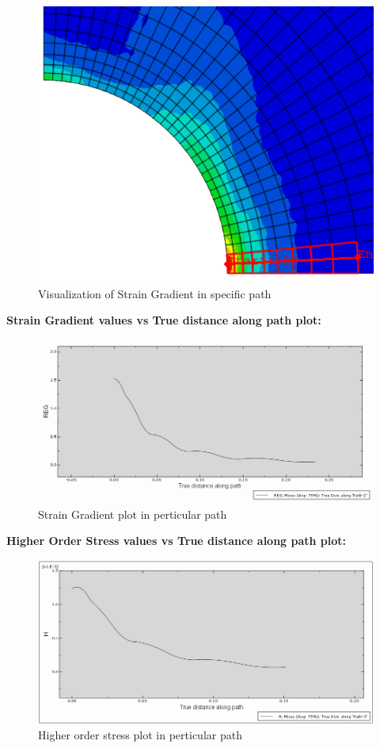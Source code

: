 \documentclass[12pt]{article}
\begin{document}
\begin{figure}[H]
	\begin{center}
		\includegraphics[scale=1]{path_full_grad_crop.png} 
	\end{center}  
	\caption{Visualization of Strain Gradient in specific path}
\end{figure}
\textbf{Strain Gradient values vs True distance along path plot:}
\begin{figure}[H]
\advance\leftskip-0.5cm
		\includegraphics[scale=0.6]{path_full_grad_plot.png} 
	    \caption{Strain Gradient plot in perticular path}
\end{figure}
\vspace{1cm}
\textbf{Higher Order Stress values vs True distance along path plot:}
\begin{figure}[H]
\advance\leftskip-0.5cm
		\includegraphics[scale=0.6]{Higher_order_stress_plot.png}  
	\caption{Higher order stress plot in perticular path}
\end{figure}
\end{document}
